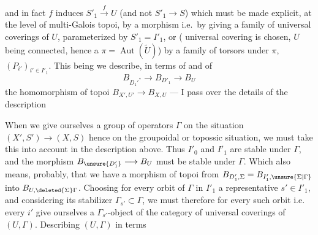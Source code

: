 and in fact $f$ induces $S'_1\xrightarrow{f}U$ (and not $S'_1\longrightarrow S$) which must be made explicit, at the level  of multi-Galois topoi, by a morphism
i.e.\ by giving a family of universal coverings of $U$, parameterized by $S'_1=I'_1$, or ( universal covering is chosen, $U$ being connected, hence a $\pi=\operatorname{Aut}(\widetilde U)$) by a family of torsors under  $\pi$, $(P_{i'})_{i'\in I'_1}$.
This being   we  describe, in terms of
and of
\[
B_{D_1'^*}\longrightarrow B_{D'_1}\longrightarrow B_U
\]
 the homomorphism of topoi $B_{X',U'}\longrightarrow B_{X,U}$
--- I pass over the details of the description


When we give ourselves a group of operators \deleted{$\Sigma$}$\Gamma$ on the situation $(X',S')\longrightarrow(X,S)$ hence on the groupoidal or topossic situation, we must take this into account in the description above.
Thus $I'_0$ and $I'_1$ are stable under $\Gamma$, and the morphism  $B_{\unsure{D'_1}}\longrightarrow B_U$ must be stable under $\Gamma$.
Which also means, probably, that we have a morphism of topoi from
$B_{D'_1,\Sigma}=B_{I'_1,\unsure{\Sigma|\Gamma}}$
into $B_{U,\deleted{\Sigma}\Gamma}$.
Choosing for every orbit of $\Gamma$ in $I'_1$ a representative $s'\in I'_1$, and considering its stabilizer $\Gamma_{s'}\subset\Gamma$, we must therefore for every such orbit i.e.\  every $i'$ give ourselves a $\Gamma_{s'}$-object of the category of universal coverings of $(U,\Gamma)$.
  Describing $(U,\Gamma)$ in terms

